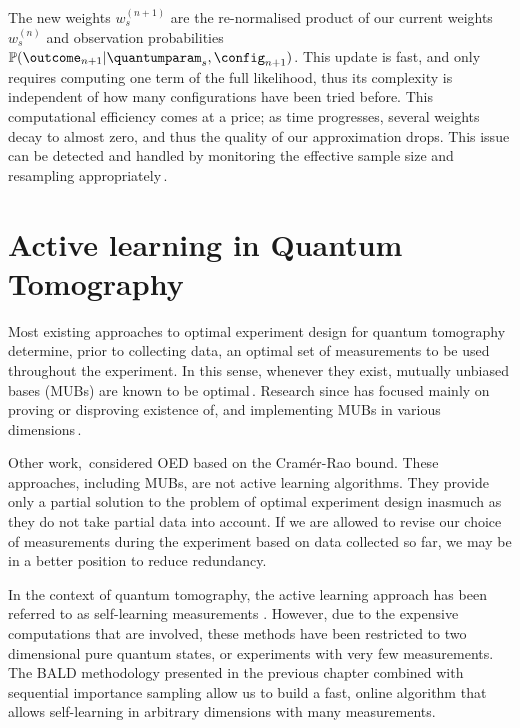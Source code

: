 The new weights $w^{(n+1)}_s$ are the re-normalised product of our current weights $w^{(n)}_s$ and observation probabilities $\mathbb{P}(\outcome_{n+1}\vert\quantumparam_s,\config_{n+1})$. This update is fast, and only requires computing one term of the full likelihood, thus its complexity is independent of how many configurations have been tried before. This computational efficiency comes at a price; as time progresses, several weights decay to almost zero, and thus the quality of our approximation drops. This issue can be detected and handled by monitoring the effective sample size and resampling appropriately\,\citep{SMCBook}.


\section{Active learning in Quantum Tomography}

Most existing approaches to optimal experiment design for quantum tomography determine, prior to collecting data, an optimal set of measurements to be used throughout the experiment. In this sense, whenever they exist, mutually unbiased bases (MUBs) are known to be optimal\,\citep{MUBFirst,MUBExperiment}. Research since has focused mainly on proving or disproving existence of, and implementing MUBs in various dimensions\,\citep{DimensionSix,MUBQutrit,MUBExperiment}.

Other work,\,\citep{OEDFirst,OEDAverage} considered OED based on the Cram\'{e}r-Rao bound. These approaches, including MUBs, are not active learning algorithms. They provide only a partial solution to the problem of optimal experiment design inasmuch as they do not take partial data into account. If we are allowed to revise our choice of measurements during the experiment based on data collected so far, we may be in a better position to reduce redundancy.

In the context of quantum tomography, the active learning approach has been referred to as self-learning measurements \citep{SelfLearning, SelfLearningExperimental}. However, due to the expensive computations that are involved, these methods have been restricted to two dimensional pure quantum states, or experiments with very few measurements. The BALD methodology presented in the previous chapter combined with sequential importance sampling allow us to build a fast, online algorithm that allows self-learning in arbitrary dimensions with many measurements. 

